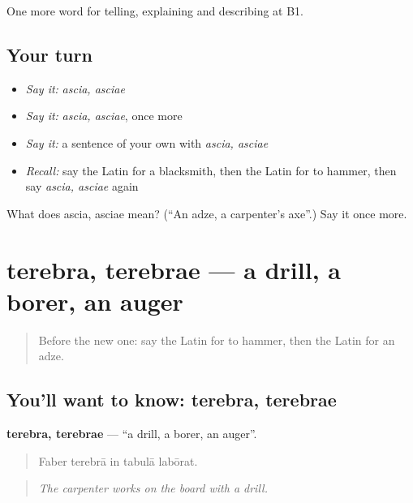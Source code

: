 \begin{grammarlens}[title={What you've built}]
One more word for telling, explaining and describing at B1.
\end{grammarlens}

\subsection*{Your turn}
\begin{itemize}
\raggedright
  \item \emph{Say it:} \emph{ascia, asciae}
  \item \emph{Say it:} \emph{ascia, asciae}, once more
  \item \emph{Say it:} a sentence of your own with \emph{ascia, asciae}
  \item \emph{Recall:} say the Latin for a blacksmith, then the Latin for to hammer, then say \emph{ascia, asciae} again
\end{itemize}

\begin{tcolorbox}[breakable,colback=teal!4,colframe=teal!35!black,title={Before you move on}]
What does ascia, asciae mean? (\textquotedblleft{}An adze, a carpenter's axe\textquotedblright{}.) Say it once more.
\end{tcolorbox}
\section[terebra, terebrae]{terebra, terebrae — a drill, a borer, an auger}

\label{lesson:LA-C470-terebra}



\begin{quote}
Before the new one: say the Latin for to hammer, then the Latin for an adze.
\end{quote}

\subsection*{You'll want to know: terebra, terebrae}
\textbf{terebra, terebrae} — \textquotedblleft{}a drill, a borer, an auger\textquotedblright{}.

\begin{quote}
Faber terebrā in tabulā labōrat.
\end{quote}

\begin{quote}
\emph{The carpenter works on the board with a drill.}
\end{quote}

